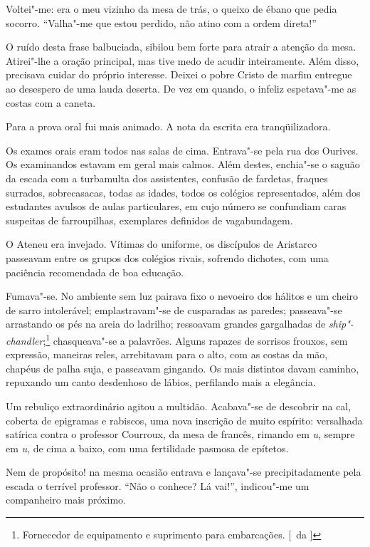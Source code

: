 
Voltei"-me: era o meu vizinho da mesa de
trás, o queixo de ébano que pedia socorro. ``Valha"-me que estou
perdido, não atino com a ordem direta!'' 

O ruído desta frase balbuciada,
sibilou bem forte para atrair a atenção da mesa. Atirei"-lhe a oração
principal, mas tive medo de acudir inteiramente. Além disso, precisava
cuidar do próprio interesse. Deixei o pobre Cristo de marfim entregue
ao desespero de uma lauda deserta. De vez em quando, o infeliz
espetava"-me as costas com a caneta. 

Para a prova oral fui mais
animado. A nota da escrita era tranqüilizadora. 

Os exames orais eram
todos nas salas de cima. Entrava"-se pela rua dos Ourives. Os
examinandos estavam em geral mais calmos. Além destes, enchia"-se o
saguão da escada com a turbamulta dos assistentes, confusão de
fardetas, fraques surrados, sobrecasacas, todas as idades, todos os
colégios representados, além dos estudantes avulsos de aulas
particulares, em cujo número se confundiam caras suspeitas de
farroupilhas, exemplares definidos de vagabundagem. 

O Ateneu era
invejado. Vítimas do uniforme, os discípulos de Aristarco passeavam
entre os grupos dos colégios rivais, sofrendo dichotes, com uma
paciência recomendada de boa educação. 

Fumava"-se. No ambiente sem luz
pairava fixo o nevoeiro dos hálitos e um cheiro de sarro intolerável;
emplastravam"-se de cusparadas as paredes; passeava"-se arrastando os
pés na areia do ladrilho; ressoavam grandes gargalhadas de
\textit{ship"-chandler};\footnote{ Fornecedor de equipamento e suprimento para embarcações. [~da ]} 
chasqueava"-se a palavrões. Alguns rapazes de sorrisos 
frouxos, sem expressão, maneiras reles, arrebitavam
para o alto, com as costas da mão, chapéus de palha suja, e passeavam
gingando. Os mais distintos davam caminho, repuxando um canto
desdenhoso de lábios, perfilando mais a elegância. 

Um rebuliço
extraordinário agitou a multidão. Acabava"-se de descobrir na cal,
coberta de epigramas e rabiscos, uma nova inscrição de muito espírito:
versalhada satírica contra o professor Courroux, da mesa de francês,
rimando em \textit{u}, sempre em \textit{u}, de cima a baixo, com uma fertilidade pasmosa
de epítetos. 

Nem de propósito! na mesma ocasião entrava e lançava"-se
precipitadamente pela escada o terrível professor. ``Não o conhece? Lá
vai!'', indicou"-me um companheiro mais próximo. 

